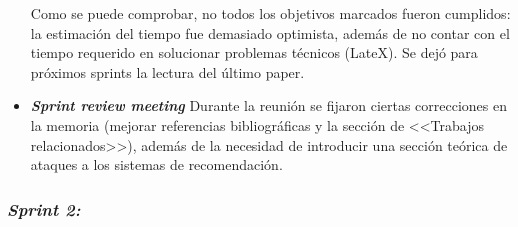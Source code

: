 \begin{itemize}
	Como se puede comprobar, no todos los objetivos marcados fueron cumplidos: la estimación del tiempo fue demasiado optimista, además de no contar con el tiempo requerido en solucionar problemas técnicos (LateX). Se dejó para próximos sprints la lectura del último paper.
	
	\item \textbf{\textit{Sprint review meeting}}
	Durante la reunión se fijaron ciertas correcciones en la memoria (mejorar referencias bibliográficas y la sección de <<Trabajos relacionados>>), además de la necesidad de introducir una sección teórica de ataques a los sistemas de recomendación.
	
	
\end{itemize}


\subsubsection{\textit{Sprint 2:}}

